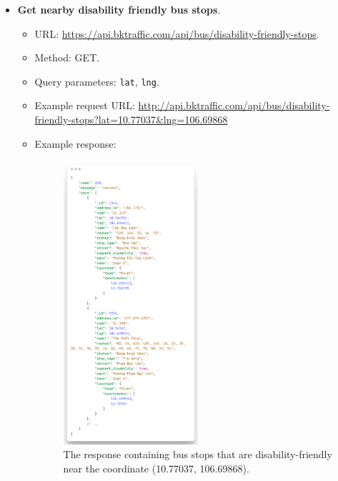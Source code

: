 \begin{itemize}
    \item \textbf{Get nearby disability friendly bus stops}.
    \begin{itemize}
        \item URL: \url{https://api.bktraffic.com/api/bus/disability-friendly-stops}.
        \item Method: GET.
        \item Query parameters: \lstinline{lat}, \lstinline{lng}.
        \item Example request URL: \url{http://api.bktraffic.com/api/bus/disability-friendly-stops?lat=10.77037&lng=106.69868}
        \item Example response:
        \begin{figure}[H]
            \centering
            \includegraphics[width=0.5\textwidth]{assets/images/Implementation/nearby_disable_response.png}
            \caption{The response containing bus stops that are disability-friendly near the coordinate (10.77037, 106.69868).}
            \label{fig:nearby_disable_response}
        \end{figure}
    \end{itemize}


\end{itemize}
